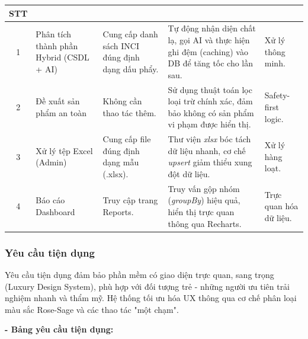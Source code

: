 \documentclass[12pt,a4paper]{article}
\begin{document}
\begin{center}
\renewcommand{\arraystretch}{1.3}
\begin{tabular}{|c|>{\raggedright\arraybackslash}p{3.5cm}|>{\raggedright\arraybackslash}p{3.5cm}|>{\raggedright\arraybackslash}p{4.5cm}|>{\raggedright\arraybackslash}p{2cm}|}
\hline
\textbf{STT} 
& \multicolumn{1}{c|}{\textbf{Nghiệp vụ}} 
& \multicolumn{1}{c|}{\textbf{Người dùng}} 
& \multicolumn{1}{c|}{\textbf{Phần mềm}} 
& \multicolumn{1}{c|}{\textbf{Ghi chú}} \\
\hline

1 & Phân tích thành phần Hybrid (CSDL + AI) 
& Cung cấp danh sách INCI đúng định dạng dấu phẩy. 
& Tự động nhận diện chất lạ, gọi AI và thực hiện ghi đệm (caching) vào DB để tăng tốc cho lần sau. 
& Xử lý thông minh. \\
\hline

2 & Đề xuất sản phẩm an toàn 
& Không cần thao tác thêm. 
& Sử dụng thuật toán lọc loại trừ chính xác, đảm bảo không có sản phẩm vi phạm được hiển thị. 
& Safety-first logic. \\
\hline

3 & Xử lý tệp Excel (Admin) 
& Cung cấp file đúng định dạng mẫu (.xlsx). 
& Thư viện \textit{xlsx} bóc tách dữ liệu nhanh, cơ chế \textit{upsert} giảm thiểu xung đột dữ liệu. 
& Xử lý hàng loạt. \\
\hline

4 & Báo cáo Dashboard 
& Truy cập trang Reports. 
& Truy vấn gộp nhóm (\textit{groupBy}) hiệu quả, hiển thị trực quan thông qua Recharts. 
& Trực quan hóa dữ liệu. \\
\hline
\end{tabular}
\end{center}

\subsubsection{Yêu cầu tiện dụng}
Yêu cầu tiện dụng đảm bảo phần mềm có giao diện trực quan, sang trọng (Luxury Design System), phù hợp với đối tượng trẻ - những người ưu tiên trải nghiệm nhanh và thẩm mỹ. Hệ thống tối ưu hóa UX thông qua cơ chế phân loại màu sắc Rose-Sage và các thao tác "một chạm".

\textbf{- Bảng yêu cầu tiện dụng:}
\end{document}
